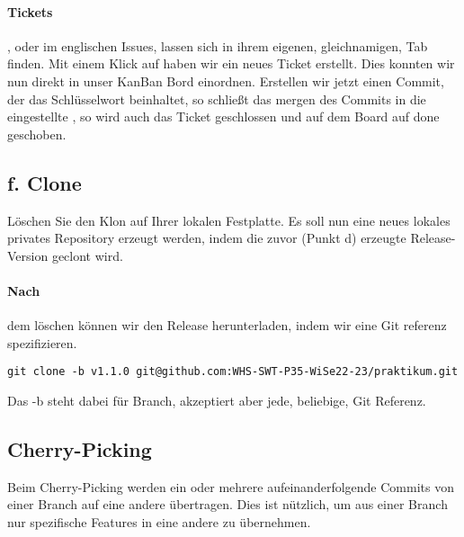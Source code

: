 \paragraph{Tickets}, oder im englischen Issues, lassen sich in ihrem eigenen, gleichnamigen, Tab finden.
Mit einem Klick auf  haben wir ein neues Ticket erstellt.
Dies konnten wir nun direkt in unser KanBan Bord einordnen.
Erstellen wir jetzt einen Commit, der das Schlüsselwort  beinhaltet, so schließt das mergen des Commits in die eingestellte , so wird auch das Ticket geschlossen und auf dem Board auf done geschoben.

\subsection{f. Clone}\label{subsec:f.-clone}
Löschen Sie den Klon auf Ihrer lokalen Festplatte.
Es soll nun eine neues lokales privates Repository erzeugt werden, indem die zuvor (Punkt d) erzeugte  Release-Version geclont wird.

\paragraph{Nach} dem löschen können wir den Release herunterladen, indem wir eine Git referenz spezifizieren.
\begin{lstlisting}[label={lst:clone-release}, caption={Herunterladen eines Releases}]
git clone -b v1.1.0 git@github.com:WHS-SWT-P35-WiSe22-23/praktikum.git
\end{lstlisting}
Das -b steht dabei für Branch, akzeptiert aber jede, beliebige, Git Referenz.

\subsection{Cherry-Picking}\label{subsec:cherry-picking}
Beim Cherry-Picking werden ein oder mehrere aufeinanderfolgende Commits von einer Branch auf eine andere übertragen.
Dies ist nützlich, um aus einer Branch nur spezifische Features in eine andere zu übernehmen.